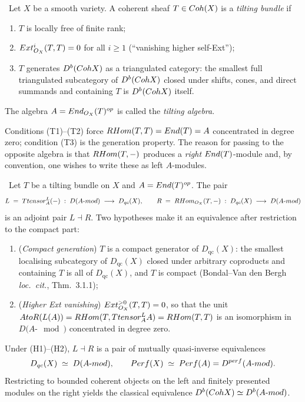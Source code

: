 \begin{definition}
\label{def:tilting-bundle}
\ClaimStatusDefinition\ Let $X$ be a smooth variety. A coherent sheaf
$T \in Coh(X)$ is a \emph{tilting bundle} if
\begin{enumerate}
\item[(T1)] $T$ is locally free of finite rank;
\item[(T2)] $Ext^{i}_{O_X}(T, T) = 0$ for all $i \geq 1$
           (``vanishing higher self-Ext'');
\item[(T3)] $T$ generates $D^{b}(Coh X)$ as a triangulated category:
           the smallest full triangulated subcategory of $D^{b}(Coh X)$ closed
           under shifts, cones, and direct summands and containing $T$ is
           $D^{b}(Coh X)$ itself.
\end{enumerate}
The algebra $A = End_{O_X}(T)^{op}$ is called the \emph{tilting
algebra}.
\end{definition}

Conditions (T1)--(T2) force $RHom(T, T) = End(T) = A$ concentrated in degree
zero; condition (T3) is the generation property. The reason for passing to the
opposite algebra is that $RHom(T, -)$ produces a \emph{right} $End(T)$-module
and, by convention, one wishes to write these as left $A$-modules.

\begin{theorem}
\label{thm:derived-morita-tilting}
\ClaimStatusTheorem\ Let $T$ be a tilting bundle on $X$ and $A = End(T)^{op}$.
The pair
\[
  L \;=\; T tensor^{L}_{A} (-) \;:\; D(A\text{-}mod) \;\longrightarrow\; D_{qc}(X),
  \qquad
  R \;=\; RHom_{O_X}(T, -) \;:\; D_{qc}(X) \;\longrightarrow\; D(A\text{-}mod)
\]
is an adjoint pair $L \dashv R$. Two hypotheses make it an equivalence after
restriction to the compact part:
\begin{enumerate}
\item[(H1)] (\emph{Compact generation}) $T$ is a compact generator of
$D_{\mathrm{qc}}(X)$: the smallest localising subcategory of $D_{\mathrm{qc}}(X)$
closed under arbitrary coproducts and containing $T$ is all of $D_{\mathrm{qc}}(X)$,
and $T$ is compact (Bondal--Van den Bergh \emph{loc.\ cit.}, Thm.~3.1.1);
\item[(H2)] (\emph{Higher Ext vanishing}) $Ext^{>0}_{O_X}(T, T) = 0$,
so that the unit $A to R(L(A)) = RHom(T, T tensor^L_A A) = RHom(T, T)$ is an
isomorphism in $D(A\text{-}\mod)$ concentrated in degree zero.
\end{enumerate}
Under (H1)--(H2), $L \dashv R$ is a pair of mutually quasi-inverse equivalences
\[
  D_{qc}(X) \;\simeq\; D(A\text{-}mod), \qquad
  Perf(X) \;\simeq\; Perf(A) = D^{perf}(A\text{-}mod).
\]
Restricting to bounded coherent objects on the left and finitely presented
modules on the right yields the classical equivalence
$D^{b}(Coh X) \simeq D^{b}(A\text{-}mod)$.
\end{theorem}

